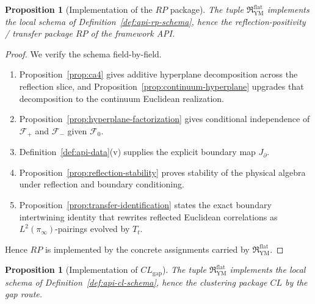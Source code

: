 \documentclass[11pt]{article}
\newtheorem{proposition}[theorem]{Proposition}
\theoremstyle{definition}
\theoremstyle{remark}
\begin{document}
\begin{proposition}[Implementation of the \(RP\) package]
\label{prop:api-rp}
The tuple \(\mathfrak R_{\mathrm{YM}}^{\mathrm{flat}}\) implements the local
schema of Definition~\ref{def:api-rp-schema}, hence the reflection-positivity /
transfer package \(RP\) of the framework API.
\end{proposition}

\begin{proof}
We verify the schema field-by-field.
\begin{enumerate}[label=\textnormal{(RP\arabic*)},leftmargin=1.5em]
\item Proposition~\ref{prop:ca4} gives additive hyperplane decomposition across
the reflection slice, and Proposition~\ref{prop:continuum-hyperplane} upgrades
that decomposition to the continuum Euclidean realization.
\item Proposition~\ref{prop:hyperplane-factorization} gives conditional
independence of \(\mathcal F_+\) and \(\mathcal F_-\) given \(\mathcal F_0\).
\item Definition~\ref{def:api-data}\textnormal{(v)} supplies the explicit
boundary map \(J_{\partial}\).
\item Proposition~\ref{prop:reflection-stability} proves stability of the
physical algebra under reflection and boundary conditioning.
\item Proposition~\ref{prop:transfer-identification} states the exact boundary
intertwining identity that rewrites reflected Euclidean correlations as
\(L^2(\pi_\infty)\)-pairings evolved by \(T_t\).
\end{enumerate}
Hence \(RP\) is implemented by the concrete assignments carried by
\(\mathfrak R_{\mathrm{YM}}^{\mathrm{flat}}\).
\end{proof}

\begin{proposition}[Implementation of \(CL_{\mathrm{gap}}\)]
\label{prop:api-cl}
The tuple \(\mathfrak R_{\mathrm{YM}}^{\mathrm{flat}}\) implements the local
schema of Definition~\ref{def:api-cl-schema}, hence the clustering package
\(CL\) by the gap route.
\end{proposition}
\end{document}
